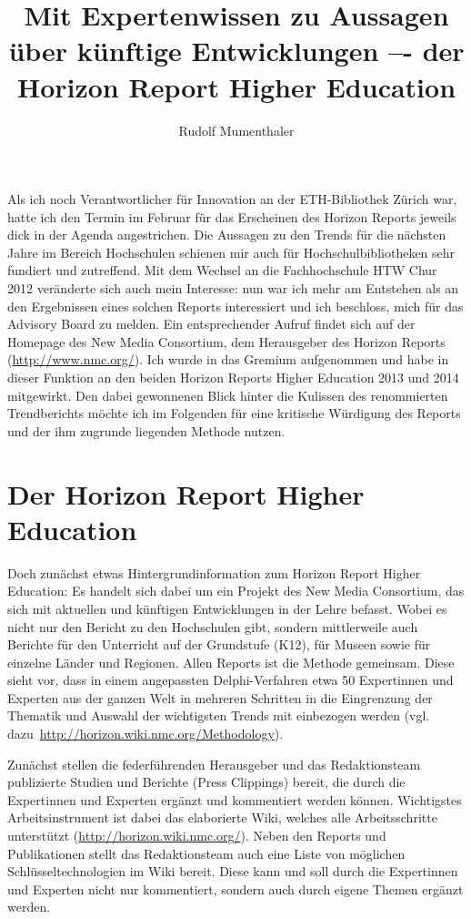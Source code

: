 \documentclass[a4paper,
fontsize=11pt,
oneside,
numbers=noperiodatend,
parskip=half-,
bibliography=totoc,
final
]{scrartcl}
\title{\LARGE{Mit Expertenwissen zu Aussagen über künftige Entwicklungen –- der Horizon Report Higher Education}} %
\author{Rudolf Mumenthaler} %
\date{}
\begin{document}
\maketitle
\thispagestyle{fancyplain} 


Als ich noch Verantwortlicher für Innovation an der ETH-Bibliothek
Zürich war, hatte ich den Termin im Februar für das Erscheinen des
Horizon Reports jeweils dick in der Agenda angestrichen. Die Aussagen zu
den Trends für die nächsten Jahre im Bereich Hochschulen schienen mir
auch für Hochschulbibliotheken sehr fundiert und zutreffend. Mit dem
Wechsel an die Fachhochschule HTW Chur 2012 veränderte sich auch mein
Interesse: nun war ich mehr am Entstehen als an den Ergebnissen eines
solchen Reports interessiert und ich beschloss, mich für das Advisory
Board zu melden. Ein entsprechender Aufruf findet sich auf der Homepage
des New Media Consortium, dem Herausgeber des Horizon Reports
(\url{http://www.nmc.org/}). Ich wurde in das Gremium aufgenommen und
habe in dieser Funktion an den beiden Horizon Reports Higher Education
2013 und 2014 mitgewirkt. Den dabei gewonnenen Blick hinter die Kulissen
des renommierten Trendberichts möchte ich im Folgenden für eine
kritische Würdigung des Reports und der ihm zugrunde liegenden Methode
nutzen.

\section*{Der Horizon Report Higher
Education}\label{der-horizon-report-higher-education}

Doch zunächst etwas Hintergrundinformation zum Horizon Report Higher
Education: Es handelt sich dabei um ein Projekt des New Media
Consortium, das sich mit aktuellen und künftigen Entwicklungen in der
Lehre befasst. Wobei es nicht nur den Bericht zu den Hochschulen gibt,
sondern mittlerweile auch Berichte für den Unterricht auf der Grundstufe
(K12), für Museen sowie für einzelne Länder und Regionen. Allen Reports
ist die Methode gemeinsam. Diese sieht vor, dass in einem angepassten
Delphi-Verfahren etwa 50 Expertinnen und Experten aus der ganzen Welt in
mehreren Schritten in die Eingrenzung der Thematik und Auswahl der
wichtigsten Trends mit einbezogen werden (vgl.
dazu~\url{http://horizon.wiki.nmc.org/Methodology}).

Zunächst stellen die federführenden Herausgeber und das Redaktionsteam
publizierte Studien und Berichte (Press Clippings) bereit, die durch die
Expertinnen und Experten ergänzt und kommentiert werden können.
Wichtigstes Arbeitsinstrument ist dabei das elaborierte Wiki, welches
alle Arbeitsschritte unterstützt
(\href{http://horizon.wiki.nmc.org}{http://horizon.wiki.nmc.org/}).
Neben den Reports und Publikationen stellt das Redaktionsteam auch eine
Liste von möglichen Schlüsseltechnologien im Wiki bereit. Diese kann und
soll durch die Expertinnen und Experten nicht nur kommentiert, sondern
auch durch eigene Themen ergänzt werden.
\end{document}
